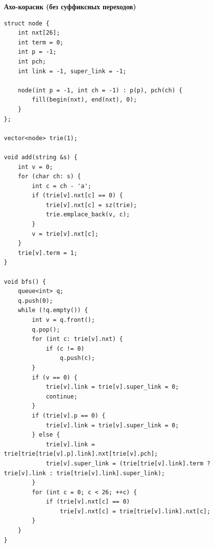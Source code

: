 \documentclass[a4paper, 10pt]{article}
\begin{document}
{\Large \textbf{Ахо-корасик (без суффиксных переходов)}}
\begin{lstlisting}
struct node {
    int nxt[26];
    int term = 0;
    int p = -1;
    int pch;
    int link = -1, super_link = -1;

    node(int p = -1, int ch = -1) : p(p), pch(ch) {
        fill(begin(nxt), end(nxt), 0);
    }
};

vector<node> trie(1);

void add(string &s) {
    int v = 0;
    for (char ch: s) {
        int c = ch - 'a';
        if (trie[v].nxt[c] == 0) {
            trie[v].nxt[c] = sz(trie);
            trie.emplace_back(v, c);
        }
        v = trie[v].nxt[c];
    }
    trie[v].term = 1;
}

void bfs() {
    queue<int> q;
    q.push(0);
    while (!q.empty()) {
        int v = q.front();
        q.pop();
        for (int c: trie[v].nxt) {
            if (c != 0)
                q.push(c);
        }
        if (v == 0) {
            trie[v].link = trie[v].super_link = 0;
            continue;
        }
        if (trie[v].p == 0) {
            trie[v].link = trie[v].super_link = 0;
        } else {
            trie[v].link = trie[trie[trie[v].p].link].nxt[trie[v].pch];
            trie[v].super_link = (trie[trie[v].link].term ? trie[v].link : trie[trie[v].link].super_link);
        }
        for (int c = 0; c < 26; ++c) {
            if (trie[v].nxt[c] == 0)
                trie[v].nxt[c] = trie[trie[v].link].nxt[c];
        }
    }
}
\end{lstlisting}
\end{document}
